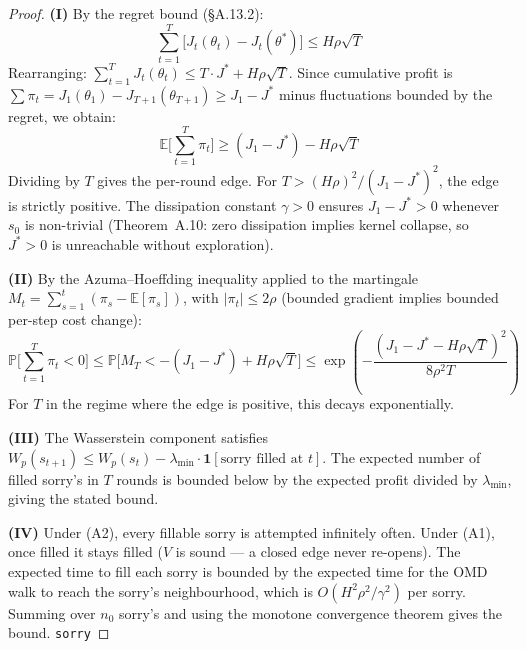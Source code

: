 \documentclass[11pt,a4paper]{article}
\theoremstyle{definition}
\theoremstyle{remark}
\begin{document}
\begin{proof}
\textbf{(I)} By the regret bound (\S A.13.2):
\[
  \sum_{t=1}^T \bigl[J_t(\theta_t) - J_t(\theta^*)\bigr] \leq H\rho\sqrt{T}
\]
Rearranging: $\sum_{t=1}^T J_t(\theta_t) \leq T \cdot J^* + H\rho\sqrt{T}$. Since cumulative profit is $\sum \pi_t = J_1(\theta_1) - J_{T+1}(\theta_{T+1}) \geq J_1 - J^*$ minus fluctuations bounded by the regret, we obtain:
\[
  \mathbb{E}\Biggl[\sum_{t=1}^T \pi_t\Biggr] \geq (J_1 - J^*) - H\rho\sqrt{T}
\]
Dividing by $T$ gives the per-round edge. For $T > (H\rho)^2 / (J_1 - J^*)^2$, the edge is strictly positive. The dissipation constant $\gamma > 0$ ensures $J_1 - J^* > 0$ whenever $s_0$ is non-trivial (Theorem~A.10: zero dissipation implies kernel collapse, so $J^* > 0$ is unreachable without exploration).

\textbf{(II)} By the Azuma--Hoeffding inequality applied to the martingale $M_t = \sum_{s=1}^t (\pi_s - \mathbb{E}[\pi_s])$, with $|\pi_t| \leq 2\rho$ (bounded gradient implies bounded per-step cost change):
\[
  \mathbb{P}\Biggl[\sum_{t=1}^T \pi_t < 0\Biggr] \leq \mathbb{P}\Biggl[M_T < -(J_1 - J^*) + H\rho\sqrt{T}\Biggr] \leq \exp\!\left(-\frac{(J_1 - J^* - H\rho\sqrt{T})^2}{8\rho^2 T}\right)
\]
For $T$ in the regime where the edge is positive, this decays exponentially.

\textbf{(III)} The Wasserstein component satisfies $W_p(s_{t+1}) \leq W_p(s_t) - \lambda_{\min} \cdot \mathbf{1}[\text{sorry filled at } t]$. The expected number of filled sorry's in $T$ rounds is bounded below by the expected profit divided by $\lambda_{\min}$, giving the stated bound.

\textbf{(IV)} Under (A2), every fillable sorry is attempted infinitely often. Under (A1), once filled it stays filled ($V$ is sound --- a closed edge never re-opens). The expected time to fill each sorry is bounded by the expected time for the OMD walk to reach the sorry's neighbourhood, which is $O(H^2\rho^2/\gamma^2)$ per sorry. Summing over $n_0$ sorry's and using the monotone convergence theorem gives the bound. \texttt{sorry}
\end{proof}
\end{document}
